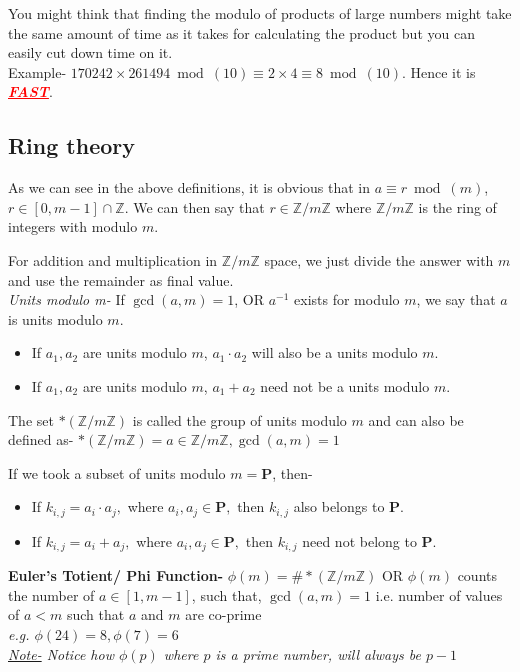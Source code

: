 	 	\begin{tcolorbox}
	 		You might think that finding the modulo of products of large numbers might take the same amount of time as it takes for calculating the product but you can easily cut down time on it. \\ Example- \(170242 \times 261494 \bmod(10) \equiv 2 \times 4 \equiv 8 \bmod(10)\). Hence it is \textcolor{red}{\textbf{\underline{\emph{FAST}}}}.
	 	\end{tcolorbox}

	 	\subsection{Ring theory}
	 		As we can see in the above definitions, it is obvious that in \(a \equiv r \bmod(m)\), \(r \in [0, m-1] \cap \mathbb{Z}\). We can then say that \(r \in \mathbb{Z}/ m \mathbb{Z}\) where \(\mathbb{Z}/ m \mathbb{Z}\) is the ring of integers with modulo \(m\). \par
	 		\indent For addition and multiplication in \(\mathbb{Z}/ m \mathbb{Z}\) space, we just divide the answer with \(m\) and use the remainder as final value.
	 		\\
	 		\noindent \emph{Units modulo m-} If \(\gcd(a,m)=1\), OR \(a^{-1}\) exists for modulo \(m\), we say that $a$ is units modulo $m$. 
	 		\begin{itemize}
	 			\item If \(a_1, a_2\) are units modulo \(m\), \( a_1 \cdot a_2 \) will also be a units modulo \(m\).
	 			\item If \(a_1, a_2\) are units modulo \(m\), \( a_1 + a_2 \) need not be a units modulo \(m\).
	 		\end{itemize}
	 		The set \(\ast(\mathbb{Z}/ m \mathbb{Z})\) is called the group of units modulo \(m\) and can also be defined as-
	 		\centering \(\ast(\mathbb{Z}/ m \mathbb{Z})={a\in \mathbb{Z}/ m \mathbb{Z}, \gcd(a,m)=1}\)
	 		\raggedright If we took a subset of units modulo \(m= \textbf{P}\), then-
	 		\begin{itemize}
	 			\item If \(k_{i,j}= a_i \cdot a_j,\) where \(a_i, a_j \in \textbf{P},\) then \(k_{i,j}\) also belongs to \(\textbf{P}\).
	 			\item If \(k_{i,j}= a_i + a_j,\) where \(a_i, a_j \in \textbf{P},\) then \(k_{i,j}\) need not belong to \(\textbf{P}\).
	 		\end{itemize}
	 		\textbf{Euler's Totient/ Phi Function-} \(\phi(m)=\# \ast(\mathbb{Z}/ m \mathbb{Z})\) OR $\phi(m)$ counts the number of \(a \in [1,m-1]\), such that, \(\gcd(a,m)=1\) i.e. number of values of \(a<m\) such that \(a\) and \(m\) are co-prime\\
	 		\emph{e.g. \(\phi(24)=8, \phi(7)=6\)} \\ \emph{\underline{Note-} Notice how \(\phi(p)\) where \(p\) is a prime number, will always be \(p-1\)}

